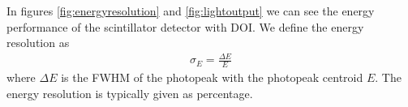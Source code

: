 In figures \ref{fig:energyresolution} and \ref{fig:lightoutput} we can see the energy performance of the scintillator detector with DOI. We define the energy resolution as
\begin{align}
\sigma_E = \frac{\Delta E}{E}
\end{align}
where $\Delta E$ is the FWHM of the photopeak with the photopeak centroid $E$. The energy resolution is typically given as percentage.
